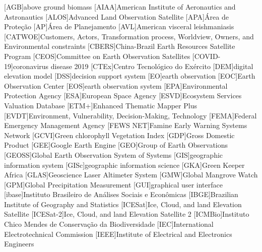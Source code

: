 \begin{acronym}[HyperLEAVES] \itemsep0pt \setlength{\parskip}{0pt}
[AGB]{above ground biomass}
[AIAA]{American Institute of Aeronautics and Astronautics}
[ALOS]{Advanced Land Observation Satellite}
[APA]{Área de Proteção}
[AP]{Área de Planejamento}
[AVL]{American visceral leishmaniasis}
[CATWOE]{Customers, Actors, Transformation process, Worldview, Owners, and Environmental constraints}
[CBERS]{China-Brazil Earth Resources Satellite Program}
[CEOS]{Committee on Earth Observation Satellites}
[COVID-19]{coronavirus disease 2019}
[CTEx]{Centro Tecnológico do Exército}
[DEM]{digital elevation model}
[DSS]{decision support system}
[EO]{earth observation}
[EOC]{Earth Observation Center}
[EOS]{earth observation system}
[EPA]{Environmental Protection Agency}
[ESA]{European Space Agency}
[ESVD]{Ecosystem Services Valuation Database}
[ETM+]{Enhanced Thematic Mapper Plus}
[EVDT]{Environment, Vulnerability, Decision-Making, Technology}
[FEMA]{Federal Emergency Management Agency}
[FEWS NET]{Famine Early Warning Systems Network}
[GCVI]{Green chlorophyll Vegetation Index}
[GDP]{Gross Domestic Product}
[GEE]{Google Earth Engine}
[GEO]{Group of Earth Observations}
[GEOSS]{Global Earth Observation System of Systems}
[GIS]{geographic information system}
[GISc]{geographic information science}
[GKA]{Green Keeper Africa}
[GLAS]{Geoscience Laser Altimeter System}
[GMW]{Global Mangrove Watch}
[GPM]{Global Precipitation Measurement}
[GUI]{graphical user interface}
[ibase]{Instituto Brasileiro de Análises Sociais e Econômicas}
[IBGE]{Brazilian Institute of Geography and Statistics}
[ICESat]{Ice, Cloud, and land Elevation Satellite}
[ICESat-2]{Ice, Cloud, and land Elevation Satellite 2}
[ICMBio]{Instituto Chico Mendes de Conservação da Biodiversidade}
[IEC]{International Electrotechnical Commission}
[IEEE]{Institute of Electrical and Electronics Engineers}

\end{acronym}
